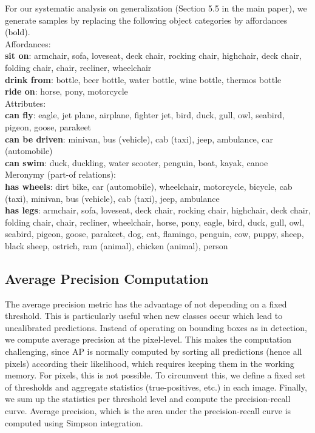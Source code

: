 For our systematic analysis on generalization (Section 5.5 in the main paper), we generate samples by replacing the following object categories by affordances (bold). 
\\

\noindent Affordances:\\
\textbf{{sit on}}: armchair, sofa, loveseat, deck chair, rocking chair, highchair, deck chair, folding chair, chair, recliner, wheelchair\\
\textbf{{drink from}}: bottle, beer bottle, water bottle, wine bottle, thermos bottle\\
\textbf{{ride on}}: horse, pony, motorcycle\\

\noindent Attributes:\\
\textbf{{can fly}}: eagle, jet plane, airplane, fighter jet, bird, duck, gull, owl, seabird, pigeon, goose, parakeet\\
\textbf{{can be driven}}: minivan, bus (vehicle), cab (taxi), jeep, ambulance, car (automobile)\\
\textbf{{can swim}}: duck, duckling, water scooter, penguin, boat, kayak, canoe\\

\noindent Meronymy (part-of relations):\\
\textbf{{has wheels}}: dirt bike, car (automobile), wheelchair, motorcycle, bicycle, cab (taxi), minivan, bus (vehicle), cab (taxi), jeep, ambulance\\
\textbf{{has legs}}: armchair, sofa, loveseat, deck chair, rocking chair, highchair, deck chair, folding chair, chair, recliner, wheelchair, horse, pony, eagle, bird, duck, gull, owl, seabird, pigeon, goose, parakeet, dog, cat, flamingo, penguin, cow, puppy, sheep, black sheep, ostrich, ram (animal), chicken (animal), person\\

\subsection*{Average Precision Computation}

The average precision metric has the advantage of not depending on a fixed threshold. This is particularly useful when new classes occur which lead to uncalibrated predictions. 
Instead of operating on bounding boxes as in detection, we compute average precision at the pixel-level. This makes the computation challenging, since AP is normally computed by sorting all predictions (hence all pixels) according their likelihood, which requires keeping them in the working memory. For pixels, this is not possible.
To circumvent this, we define a fixed set of thresholds and aggregate statistics (true-positives, etc.) in each image. Finally, we sum up the statistics per threshold level and compute the precision-recall curve. Average precision, which is the area under the precision-recall curve is computed using Simpson integration.

